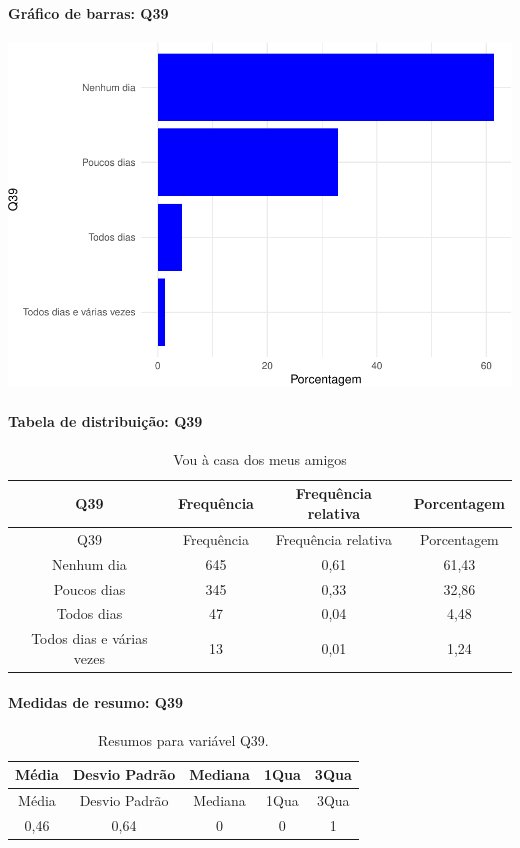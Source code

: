 \documentclass[]{article}
\let\oldparagraph\paragraph
\renewcommand{\paragraph}[1]{\oldparagraph{#1}\mbox{}}
\begin{document}
\hypertarget{gruxe1fico-de-barras-q39}{%
\paragraph{Gráfico de barras: Q39}\label{gruxe1fico-de-barras-q39}}

\begin{center}\includegraphics[width=0.75\linewidth]{relatorio_covid19_files/figure-latex/unnamed-chunk-1484-1} \end{center}

\hypertarget{tabela-de-distribuiuxe7uxe3o-q39}{%
\paragraph{Tabela de distribuição: Q39}\label{tabela-de-distribuiuxe7uxe3o-q39}}

\begin{longtable}[]{@{}cccc@{}}
\caption{\label{tab:unnamed-chunk-1485}Vou à casa dos meus amigos}\tabularnewline
\toprule
Q39 & Frequência & Frequência relativa & Porcentagem\tabularnewline
\midrule
\endfirsthead
\toprule
Q39 & Frequência & Frequência relativa & Porcentagem\tabularnewline
\midrule
\endhead
Nenhum dia & 645 & 0,61 & 61,43\tabularnewline
Poucos dias & 345 & 0,33 & 32,86\tabularnewline
Todos dias & 47 & 0,04 & 4,48\tabularnewline
Todos dias e várias vezes & 13 & 0,01 & 1,24\tabularnewline
\bottomrule
\end{longtable}

\hypertarget{medidas-de-resumo-q39}{%
\paragraph{Medidas de resumo: Q39}\label{medidas-de-resumo-q39}}

\begin{longtable}[]{@{}ccccc@{}}
\caption{\label{tab:unnamed-chunk-1486}Resumos para variável Q39.}\tabularnewline
\toprule
Média & Desvio Padrão & Mediana & 1Qua & 3Qua\tabularnewline
\midrule
\endfirsthead
\toprule
Média & Desvio Padrão & Mediana & 1Qua & 3Qua\tabularnewline
\midrule
\endhead
0,46 & 0,64 & 0 & 0 & 1\tabularnewline
\bottomrule
\end{longtable}
\end{document}
